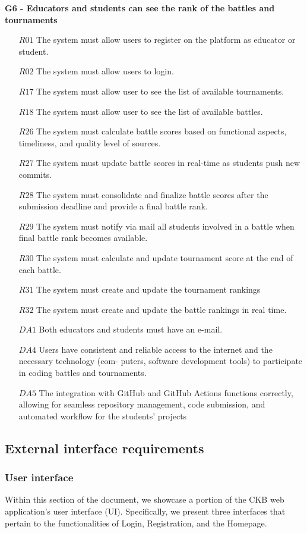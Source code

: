 \textbf{G6 - Educators and students can see the rank of the battles and tournaments}
\begin{itemize}
 \item [$R01$] The system must allow users to register on the platform as educator or student.
\item [$R02$]The system must allow users to login.
\item [$R17$]The system must allow user to see the list of available tournaments.
\item [$R18$]The system must allow user to see the list of available battles.
\item [$R26$]The system must calculate battle scores based on functional aspects, timeliness, and quality level
of sources.
\item [$R27$]The system must update  battle scores in real-time as students push new commits.
\item [$R28$]The system must consolidate and finalize battle scores after the submission deadline and provide
a final battle rank.
\item [$R29$]The system must notify via mail all students involved in a battle when final battle rank becomes
available.
\item [$R30$] The system must calculate and update tournament score at the end of each battle.
\item [$R31$] The system must create and update the tournament rankings
\item [$R32$]The system must create and update the battle rankings in real time.
\item [$DA1$]Both educators and students must have an e-mail.
\item [$DA4$]Users have consistent and reliable access to the internet and the necessary technology (com-
puters, software development tools) to participate in coding battles and tournaments.
\item [$DA5$] The integration with GitHub and GitHub Actions functions correctly, allowing for seamless
repository management, code submission, and automated workflow for the students’ projects
    
   
\end{itemize}

\newpage
\subsection{External interface requirements}
\subsubsection{User interface}
Within this section of the document, we showcase a portion of the CKB web application's user interface (UI). Specifically, we present three interfaces that pertain to the functionalities of Login, Registration, and the Homepage.

